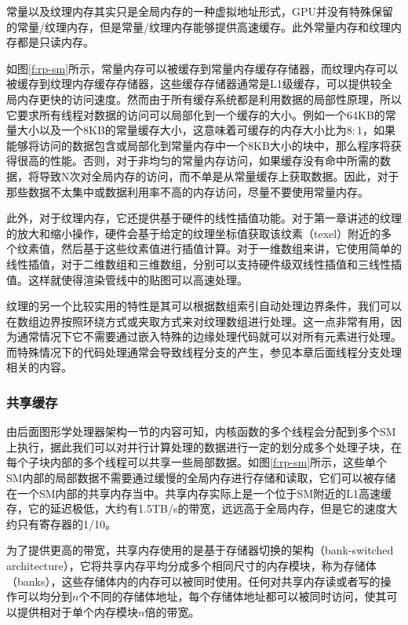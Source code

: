 常量以及纹理内存其实只是全局内存的一种虚拟地址形式，GPU并没有特殊保留的常量/纹理内存，但是常量/纹理内存能够提供高速缓存。此外常量内存和纹理内存都是只读内存。

如图\ref{f:rp-sm}所示，常量内存可以被缓存到常量内存缓存存储器，而纹理内存可以被缓存到纹理内存缓存存储器，这些缓存存储器通常是L1级缓存，可以提供较全局内存更快的访问速度。然而由于所有缓存系统都是利用数据的局部性原理，所以它要求所有线程对数据的访问可以局部化到一个缓存的大小。例如一个64KB的常量大小以及一个8KB的常量缓存大小，这意味着可缓存的内存大小比为$8:1$，如果能够将访问的数据包含或局部化到常量内存中一个8KB大小的块中，那么程序将获得很高的性能。否则，对于非均匀的常量内存访问，如果缓存没有命中所需的数据，将导致N次对全局内存的访问，而不单是从常量缓存上获取数据。因此，对于那些数据不太集中或数据利用率不高的内存访问，尽量不要使用常量内存。

此外，对于纹理内存，它还提供基于硬件的线性插值功能。对于第一章讲述的纹理的放大和缩小操作，硬件会基于给定的纹理坐标值获取该纹素（texel）附近的多个纹素值，然后基于这些纹素值进行插值计算。对于一维数组来讲，它使用简单的线性插值，对于二维数组和三维数组，分别可以支持硬件级双线性插值和三线性插值。这样就使得渲染管线中的贴图可以高速处理。

纹理的另一个比较实用的特性是其可以根据数组索引自动处理边界条件，我们可以在数组边界按照环绕方式或夹取方式来对纹理数组进行处理。这一点非常有用，因为通常情况下它不需要通过嵌入特殊的边缘处理代码就可以对所有元素进行处理。而特殊情况下的代码处理通常会导致线程分支的产生，参见本章后面线程分支处理相关的内容。




\subsubsection{共享缓存}
由后面图形学处理器架构一节的内容可知，内核函数的多个线程会分配到多个SM上执行，据此我们可以对并行计算处理的数据进行一定的划分成多个处理子块，在每个子块内部的多个线程可以共享一些局部数据。如图\ref{f:rp-sm}所示，这些单个SM内部的局部数据不需要通过缓慢的全局内存进行存储和读取，它们可以被存储在一个SM内部的共享内存当中。共享内存实际上是一个位于SM附近的L1高速缓存，它的延迟极低，大约有1.5TB/s的带宽，远远高于全局内存，但是它的速度大约只有寄存器的1/10。

为了提供更高的带宽，共享内存使用的是基于存储器切换的架构（bank-switched architecture），它将共享内存平均分成多个相同尺寸的内存模块，称为存储体（banks），这些存储体内的内存可以被同时使用。任何对共享内存读或者写的操作可以均分到$n$个不同的存储体地址，每个存储体地址都可以被同时访问，使其可以提供相对于单个内存模块$n$倍的带宽。

